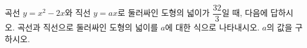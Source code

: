곡선 $y=x^2-2x$와 직선 $y=ax$로 둘러싸인 도형의 넓이가 $\dfrac{32}{3}$일 때, 다음에 답하시오. 
 곡선과 직선으로 둘러싸인 도형의 넓이를 $a$에 대한 식으로 나타내시오.
 $a$의 값을 구하시오.
